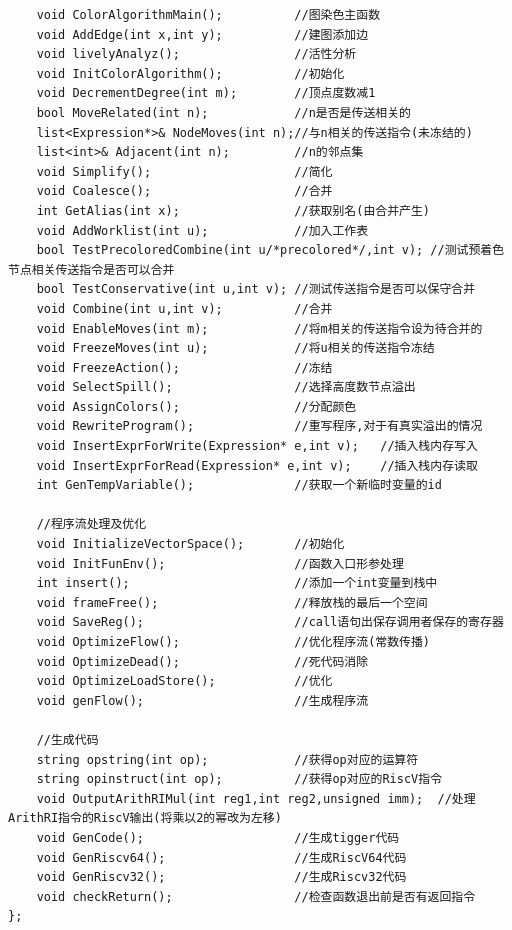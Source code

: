 \documentclass[UTF8]{article}
\begin{document}
\begin{lstlisting}
    void ColorAlgorithmMain();          //图染色主函数
    void AddEdge(int x,int y);          //建图添加边
    void livelyAnalyz();                //活性分析
    void InitColorAlgorithm();          //初始化
    void DecrementDegree(int m);        //顶点度数减1
    bool MoveRelated(int n);            //n是否是传送相关的
    list<Expression*>& NodeMoves(int n);//与n相关的传送指令(未冻结的)
    list<int>& Adjacent(int n);         //n的邻点集
    void Simplify();                    //简化
    void Coalesce();                    //合并
    int GetAlias(int x);                //获取别名(由合并产生)
    void AddWorklist(int u);            //加入工作表
    bool TestPrecoloredCombine(int u/*precolored*/,int v); //测试预着色节点相关传送指令是否可以合并
    bool TestConservative(int u,int v); //测试传送指令是否可以保守合并
    void Combine(int u,int v);          //合并
    void EnableMoves(int m);            //将m相关的传送指令设为待合并的
    void FreezeMoves(int u);            //将u相关的传送指令冻结
    void FreezeAction();                //冻结
    void SelectSpill();                 //选择高度数节点溢出
    void AssignColors();                //分配颜色
    void RewriteProgram();              //重写程序,对于有真实溢出的情况
    void InsertExprForWrite(Expression* e,int v);   //插入栈内存写入
    void InsertExprForRead(Expression* e,int v);    //插入栈内存读取
    int GenTempVariable();              //获取一个新临时变量的id

    //程序流处理及优化
    void InitializeVectorSpace();       //初始化
    void InitFunEnv();                  //函数入口形参处理
    int insert();                       //添加一个int变量到栈中
    void frameFree();                   //释放栈的最后一个空间
    void SaveReg();                     //call语句出保存调用者保存的寄存器
    void OptimizeFlow();                //优化程序流(常数传播)
    void OptimizeDead();                //死代码消除
    void OptimizeLoadStore();           //优化
    void genFlow();                     //生成程序流

    //生成代码
    string opstring(int op);            //获得op对应的运算符
    string opinstruct(int op);          //获得op对应的RiscV指令
    void OutputArithRIMul(int reg1,int reg2,unsigned imm);  //处理ArithRI指令的RiscV输出(将乘以2的幂改为左移)
    void GenCode();                     //生成tigger代码
    void GenRiscv64();                  //生成RiscV64代码
    void GenRiscv32();                  //生成Riscv32代码
    void checkReturn();                 //检查函数退出前是否有返回指令
};
\end{lstlisting}
\end{document}
